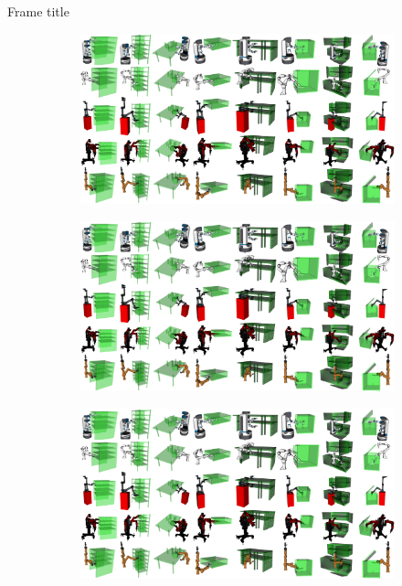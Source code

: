 \documentclass[8pt, compress]{beamer}
\begin{document}
\begin{frame}{Frame title}
\begin{figure}[t]
  \centering
  \begin{subfigure}[t]{0.33\linewidth}
    \centering
    \includegraphics[width=\linewidth]{figures/problem/problem_1.pdf}
  \end{subfigure}
  \hfill
  \begin{subfigure}[t]{0.32\linewidth}
    \centering
    \includegraphics[width=\linewidth]{figures/problem/problem_4.pdf}
  \end{subfigure}
  \hfill
  \begin{subfigure}[t]{0.33\linewidth}
    \centering
    \includegraphics[width=\linewidth]{figures/problem/problem_5.pdf}

\end{subfigure}
\end{figure}
\end{frame}
\end{document}
